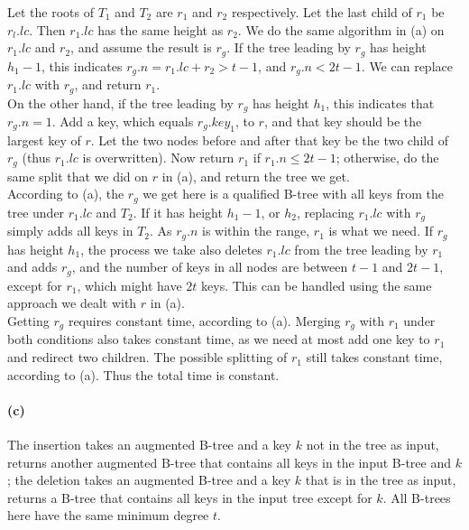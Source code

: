 \documentclass{6046}
\begin{document}
Let the roots of $T_1$ and $T_2$ are 
$r_1$ and $r_2$ respectively. 
Let the last child of $r_1$ be $r_l.lc$. 
Then $r_1.lc$ has the same height as $r_2$. 
We do the same algorithm in (a) on 
$r_1.lc$ and $r_2$, 
and assume the result is $r_g$. 
If the tree leading by $r_g$ has height $h_1-1$, 
this indicates $r_g.n = r_1.lc + r_2 > t-1$, 
and $r_g.n < 2t-1$. 
We can replace $r_1.lc$ with $r_g$, and return $r_1$. 
\\
On the other hand, 
if the tree leading by $r_g$ has height $h_1$, 
this indicates that 
$r_g.n = 1$. 
Add a key, which equals $r_g.key_1$, to $r$, 
and that key should be the largest key of $r$. 
Let the two nodes before and after that key 
be the two child of $r_g$ 
(thus $r_1.lc$ is overwritten).
Now return $r_1$ if $r_1.n \leq 2t-1$; 
otherwise, do the same split that we did on $r$ in (a), 
and return the tree we get. 
\\

According to (a), 
the $r_g$ we get here is a qualified B-tree 
with all keys from the tree under $r_1.lc$ and $T_2$. 
If it has height $h_1-1$, or $h_2$, 
replacing $r_1.lc$ with $r_g$ simply 
adds all keys in $T_2$. 
As $r_g.n$ is within the range, $r_1$ is what we need. 
If $r_g$ has height $h_1$, 
the process we take also 
deletes $r_1.lc$ from the tree leading by $r_1$ and 
adds $r_g$, 
and the number of keys in all nodes 
are between $t-1$ and $2t-1$, 
except for $r_1$, which might have $2t$ keys. 
This can be handled using the same approach we dealt with 
$r$ in (a). 
\\

Getting $r_g$ requires constant time, according to (a). 
Merging $r_g$ with $r_1$ under both conditions 
also takes constant time, 
as we need at most add one key to $r_1$ and redirect two children. 
The possible splitting of $r_1$ 
still takes constant time, 
according to (a). 
Thus the total time is constant. 
\\

\paragraph{(c)}
The insertion takes an augmented B-tree and 
a key $k$ not in the tree as input, 
returns another augmented B-tree that 
contains all keys in the input B-tree and $k$; 
the deletion takes an augmented B-tree and 
a key $k$ that is in the tree as input, 
returns a B-tree that contains all keys in 
the input tree except for $k$. 
All B-trees here have the same minimum degree $t$. 
\\
\end{document}

